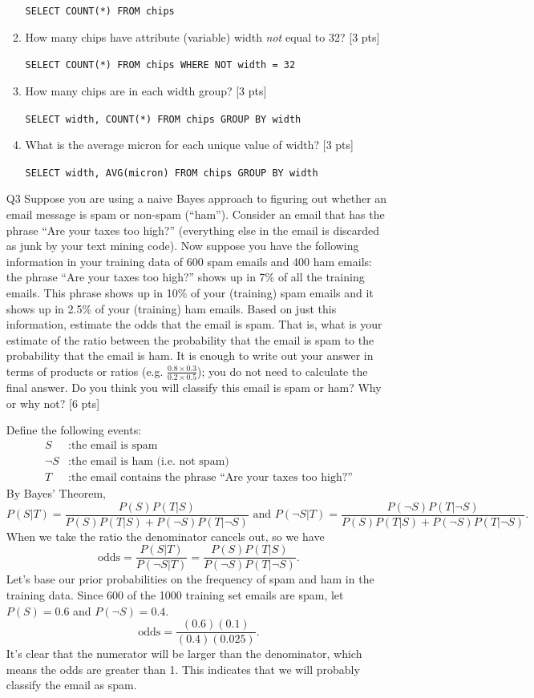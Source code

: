 \documentclass[12pt]{article}
\theoremstyle{Conjecture}
\theoremstyle{example}
\theoremstyle{remark}
\theoremstyle{lemma}
\theoremstyle{definition}
\theoremstyle{corol}
\theoremstyle{proposition}
\theoremstyle{condition}
\begin{document}
\begin{enumerate}
\begin{enumerate}
{\color{blue}\tt SELECT COUNT(*) FROM chips}
\item How many chips have attribute (variable) width {\it not} equal
  to 32? [3 pts]

{\color{blue}\tt SELECT COUNT(*) FROM chips WHERE NOT width = 32}
\item How many chips are in each width group? [3 pts]

{\color{blue}\tt SELECT width, COUNT(*) FROM chips GROUP BY width}
\item What is the average micron for each unique value of width? [3 pts]

{\color{blue}\tt SELECT width, AVG(micron) FROM chips GROUP BY width}
\end{enumerate}
\newpage

\item [Q3] Suppose you are using a naive Bayes approach to figuring
  out whether an email message is spam or non-spam (``ham''). Consider
  an email that has the phrase ``Are your taxes too high?''
  (everything else in the email is discarded as junk by your text
  mining code). Now suppose you have the following information in your
  training data of 600 spam emails and 400 ham emails: the phrase
  ``Are your taxes too high?'' shows up in 7\% of all the training
  emails. This phrase shows up in 10\% of your (training) spam emails
  and it shows up in 2.5\% of your (training) ham emails. Based on
  just this information, estimate the odds that the email is
  spam. That is, what is your estimate of the ratio between the
  probability that the email is spam to the probability that the email
  is ham. It is enough to write out your answer in terms of products
  or ratios (e.g. $\frac{0.8\times 0.3}{0.2\times 0.5}$); you do not
  need to calculate the final answer. Do you think you will classify
  this email is spam or ham? Why or why not? [6 pts]

  {\color{blue} Define the following events:
  \begin{align*}
      S &: \textrm{the email is spam} \\
      \neg S &: \textrm{the email is ham (i.e. not spam)}\\
      T &: \textrm{the email contains the phrase ``Are your taxes too high?''}
  \end{align*}
  By Bayes' Theorem,
  \[
  	P(S|T) = \frac{P(S)P(T|S)}{P(S)P(T|S)+P(\neg S)P(T|\neg S)} \textrm{ and } P(\neg S|T) = \frac{P(\neg S)P(T|\neg S)}{P(S)P(T|S)+P(\neg S)P(T|\neg S)}.
  \]
  When we take the ratio the denominator cancels out, so we have
  \[
  	\textrm{odds} = \frac{P(S|T)}{P(\neg S|T)} = \frac{P(S)P(T|S)}{P(\neg S)P(T|\neg S)}.
  \]
  Let's base our prior probabilities on the frequency of spam and ham in the training data. Since 600 of the 1000 training set emails are spam, let $P(S) = 0.6$ and $P(\neg S) = 0.4$.
  \[
  	\textrm{odds} = \frac{(0.6)(0.1)}{(0.4)(0.025)}.
  \]
  It's clear that the numerator will be larger than the denominator, which means the odds are greater than 1. This indicates that we will probably classify the email as spam.
  }


\end{enumerate}
\end{document}
